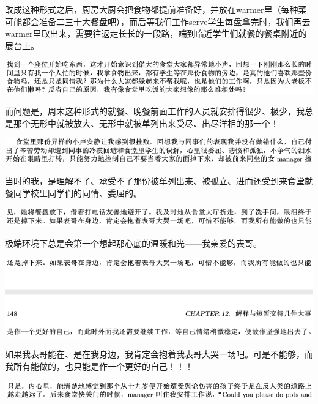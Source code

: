 \documentclass[9pt, b5paper]{article}
\begin{document}
改成这种形式之后，厨房大厨会把食物都提前准备好，并放在warmer里（每种菜可能都会准备二三十大餐盘吧），而后等我们工作serve学生每盘拿完时，我们再去warmer里取出来，需要往返走长长的一段路，端到临近学生们就餐的餐桌附近的展台上。 

\begin{center}
\includegraphics[width=.9\linewidth]{./pic/backups_plans_20210503_221559.png}
\end{center}

而问题是，周末这种形式的就餐、晚餐前面工作的人员就安排得很少、极少，我总是那个无形中就被放大、无形中就被单列出来受尽、出尽洋相的那一个！

\begin{center}
\includegraphics[width=.9\linewidth]{./pic/backups_plans_20210503_221808.png}
\end{center}

当时的我，是理解不了、承受不了那份被单列出来、被孤立、进而还受到来食堂就餐同学校里同学们的同情、委屈的。

\begin{center}
\includegraphics[width=.9\linewidth]{./pic/backups_plans_20210503_221858.png}
\end{center}

极端环境下总是会第一个想起那心底的温暖和光——我亲爱的表哥。

\begin{center}
\includegraphics[width=.9\linewidth]{./pic/backups_plans_20210503_222023.png}
\end{center}

如果我表哥能在、是在我身边，我肯定会抱着我表哥大哭一场吧。可是不能够，而我所有能做的，也只能是作一个更好的自己！！！

\begin{center}
\includegraphics[width=.9\linewidth]{./pic/backups_plans_20210503_222148.png}
\end{center}
\end{document}
